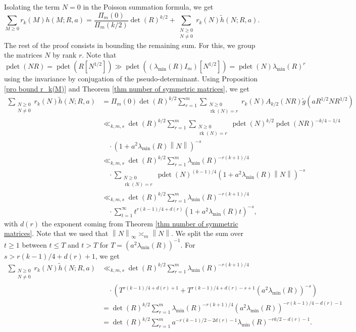 \documentclass[oneside]{amsart}
\numberwithin{equation}{section}
\theoremstyle{definition}
\theoremstyle{remark}
\theoremstyle{remark}
\newcommand{\norm}[1]{\left\lVert #1\right\rVert}		%
\DeclareMathOperator{\rk}{rk}
\DeclareMathOperator{\pdet}{pdet}
\begin{document}
Isolating the term $N=0$ in the Poisson summation formula, we get
$$\sum_{M\geq0}r_k(M)h(M;R,a)=\frac{\Pi_m(0)}{\Pi_m(k/2)}\det(R)^{k/2}+\sum_{\substack{N\geq0\\N\neq0}}r_k(N)\tilde h(N;R,a).$$
The rest of the proof consists in bounding the remaining sum. For this, we group the matrices $N$ by rank $r$. Note that
$$\pdet(NR)=\pdet(R[N^{1/2}])\gg\pdet((\lambda_{\min}(R)I_m)[N^{1/2}])=\pdet(N)\lambda_{\min}(R)^r$$
using the invariance by conjugation of the pseudo-determinant. Using Proposition \ref{pro bound r_k(M)} and Theorem \ref{thm number of symmetric matrices}, we get
\begin{align*}
\sum_{\substack{N\geq0\\N\neq0}}r_k(N)\tilde h(N;R,a)&=\Pi_m(0)\det(R)^{k/2}\sum_{r=1}^m\sum_{\substack{N\geq0\\\rk(N)=r}}r_k(N)A_{k/2}(NR)\tilde g(aR^{1/2}NR^{1/2})\\
	&\ll_{k,m,s}\det(R)^{k/2}\sum_{r=1}^m\sum_{\substack{N\geq0\\\rk(N)=r}}\pdet(N)^{k/2}\pdet(NR)^{-k/4-1/4}\\
	&\quad\cdot(1+a^2\lambda_{\min}(R)\norm N)^{-s}\\
	&\ll_{k,m,s}\det(R)^{k/2}\sum_{r=1}^m\lambda_{\min}(R)^{-r(k+1)/4}\\
	&\quad\cdot\sum_{\substack{N\geq0\\\rk(N)=r}}\pdet(N)^{(k-1)/4}(1+a^2\lambda_{\min}(R)\norm N)^{-s}\\
	&\ll_{k,m,s}\det(R)^{k/2}\sum_{r=1}^m\lambda_{\min}(R)^{-r(k+1)/4}\\
	&\quad\cdot\sum_{t=1}^\infty t^{r(k-1)/4+d(r)}(1+a^2\lambda_{\min}(R)t)^{-s},
\end{align*}
with $d(r)$ the exponent coming from Theorem \ref{thm number of symmetric matrices}. Note that we used that $\norm N_\infty\asymp_m\norm N$. We split the sum over $t\geq1$ between $t\leq T$ and $t>T$ for $T=(a^2\lambda_{\min}(R))^{-1}$. For $s>r(k-1)/4+d(r)+1$, we get
\begin{align*}
\sum_{\substack{N\geq0\\N\neq0}}r_k(N)\tilde h(N;R,a)&\ll_{k,m,s}\det(R)^{k/2}\sum_{r=1}^m\lambda_{\min}(R)^{-r(k+1)/4}\\
	&\quad\cdot\left(T^{r(k-1)/4+d(r)+1}+T^{r(k-1)/4+d(r)-s+1}(a^2\lambda_{\min}(R))^{-s}\right)\\
	&=\det(R)^{k/2}\sum_{r=1}^m\lambda_{\min}(R)^{-r(k+1)/4}(a^2\lambda_{\min}(R))^{-r(k-1)/4-d(r)-1}\\
	&=\det(R)^{k/2}\sum_{r=1}^ma^{-r(k-1)/2-2d(r)-1}\lambda_{\min}(R)^{-rk/2-d(r)-1}.
\end{align*}
\end{document}
